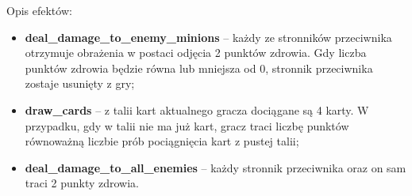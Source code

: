 Opis efektów:

\begin{itemize}
	\item \textbf{deal\_damage\_to\_enemy\_minions} -- każdy ze stronników przeciwnika otrzymuje obrażenia w postaci odjęcia 2 punktów zdrowia. Gdy liczba punktów zdrowia będzie równa lub mniejsza od 0, stronnik przeciwnika zostaje usunięty z gry;
	\item \textbf{draw\_cards} -- z talii kart aktualnego gracza dociągane są 4 karty. W przypadku, gdy w talii nie ma już kart, gracz traci liczbę punktów równoważną liczbie prób pociągnięcia kart z pustej talii;
	\item \textbf{deal\_damage\_to\_all\_enemies} -- każdy stronnik przeciwnika oraz on sam traci 2 punkty zdrowia.
\end{itemize}